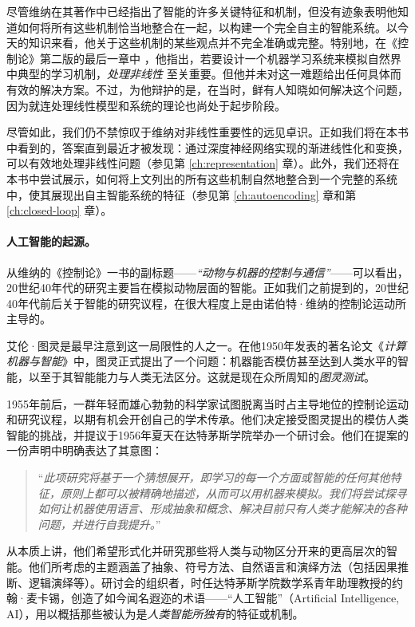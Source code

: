 \documentclass[../../book-main_zh.tex]{subfiles}
\begin{document}
尽管维纳在其著作中已经指出了智能的许多关键特征和机制，但没有迹象表明他知道如何将所有这些机制恰当地整合在一起，以构建一个完全自主的智能系统。以今天的知识来看，他关于这些机制的某些观点并不完全准确或完整。特别地，在《控制论》第二版的最后一章中 \cite{Wiener-Cybernetics-1961}，他指出，若要设计一个机器学习系统来模拟自然界中典型的学习机制，{\em 处理非线性} 至关重要。但他并未对这一难题给出任何具体而有效的解决方案。不过，为他辩护的是，在当时，鲜有人知晓如何解决这个问题，因为就连处理线性模型和系统的理论也尚处于起步阶段。

尽管如此，我们仍不禁惊叹于维纳对非线性重要性的远见卓识。正如我们将在本书中看到的，答案直到最近才被发现：通过深度神经网络实现的渐进线性化和变换，可以有效地处理非线性问题（参见第 \ref{ch:representation} 章）。此外，我们还将在本书中尝试展示，如何将上文列出的所有这些机制自然地整合到一个完整的系统中，使其展现出自主智能系统的特征（参见第 \ref{ch:autoencoding} 章和第 \ref{ch:closed-loop} 章）。

\paragraph{人工智能的起源。}
从维纳的《控制论》一书的副标题——{\em “动物与机器的控制与通信”}——可以看出，20世纪40年代的研究主要旨在模拟动物层面的智能。正如我们之前提到的，20世纪40年代前后关于智能的研究议程，在很大程度上是由诺伯特·维纳的控制论运动所主导的。

艾伦·图灵是最早注意到这一局限性的人之一。在他1950年发表的著名论文《{\em 计算机器与智能}》\cite{Turing-1950}中，图灵正式提出了一个问题：机器能否模仿甚至达到人类水平的智能，以至于其智能能力与人类无法区分。这就是现在众所周知的{\em 图灵测试}。

1955年前后，一群年轻而雄心勃勃的科学家试图脱离当时占主导地位的控制论运动和研究议程，以期有机会开创自己的学术传承。他们决定接受图灵提出的模仿人类智能的挑战，并提议于1956年夏天在达特茅斯学院举办一个研讨会。他们在提案的一份声明中明确表达了其意图：
\begin{quote}
    ``{\em 此项研究将基于一个猜想展开，即学习的每一个方面或智能的任何其他特征，原则上都可以被精确地描述，从而可以用机器来模拟。我们将尝试探寻如何让机器使用语言、形成抽象和概念、解决目前只有人类才能解决的各种问题，并进行自我提升。}''
\end{quote}
从本质上讲，他们希望形式化并研究那些将人类与动物区分开来的更高层次的智能。他们所考虑的主题涵盖了抽象、符号方法、自然语言和演绎方法（包括因果推断、逻辑演绎等）。研讨会的组织者，时任达特茅斯学院数学系青年助理教授的约翰·麦卡锡，创造了如今闻名遐迩的术语——“人工智能”（Artificial Intelligence, AI），用以概括那些被认为是{\em 人类智能所独有}的特征或机制。
\end{document}

